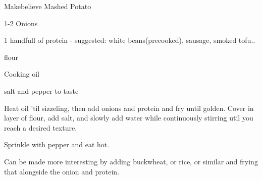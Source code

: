 \begin{recipe}{Makebelieve Mashed Potato}
  \rIngr[1-2]
\item 1-2 Onions
\item 1 handfull of protein - suggested: white beans(precooked),
  sausage, smoked tofu..
\item flour
\item Cooking oil
\item salt and pepper to taste
  \rBody

  Heat oil 'til sizzeling, then add onions and protein and fry until golden.
  Cover in layer of flour, add salt, and slowly add water while
  continuously stirring util
  you reach a desired texture.

  Sprinkle with pepper and eat hot.

  Can be made more interesting by adding buckwheat, or rice, or
  similar and frying
  that alongside the onion and protein.
\end{recipe}
